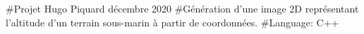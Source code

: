\#\+Projet Hugo Piquard décembre 2020 \#\+Génération d’une image 2D représentant l’altitude d’un terrain sous-\/marin à partir de coordonnées. \#\+Language\+: C++ 